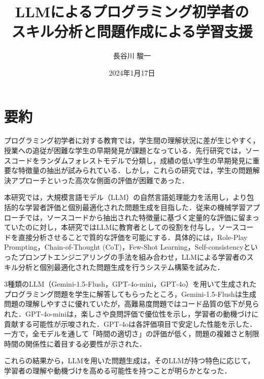 \documentclass[11pt]{jreport}
\begin{document}
\title{LLMによるプログラミング初学者の\\スキル分析と問題作成による学習支援}
\author{長谷川 駿一}
\date{2024年1月17日}

\maketitle

\chapter*{要約}
プログラミング初学者に対する教育では，学生間の理解状況に差が生じやすく，授業への追従が困難な学生の早期発見が課題となっている．先行研究では，ソースコードをランダムフォレストモデルで分類し，成績の低い学生の早期発見に重要な特徴量の抽出が試みられている．しかし，これらの研究では，学生の問題解決アプローチといった高次な側面の評価が困難であった．

本研究では，大規模言語モデル（LLM）の自然言語処理能力を活用し，より包括的な学習者評価と個別最適化された問題生成を目指した．従来の機械学習アプローチでは，ソースコードから抽出された特徴量に基づく定量的な評価に留まっていたのに対し，本研究ではLLMに教育者としての役割を付与し，ソースコードを直接分析させることで質的な評価を可能にする．具体的には，Role-Play Prompting，Chain-of-Thought (CoT)，Few-Shot Learning，Self-consistencyといったプロンプトエンジニアリングの手法を組み合わせ，LLMによる学習者のスキル分析と個別最適化された問題生成を行うシステム構築を試みた．

3種類のLLM（Gemini-1.5-Flush，GPT-4o-mini，GPT-4o）を用いて生成されたプログラミング問題を学生に解答してもらったところ，Gemini-1.5-Flushは生成問題の理解しやすさに優れていたが，高難易度問題ではコード品質の低下が見られた．GPT-4o-miniは，楽しさや良問評価で優位性を示し，学習者の動機づけに貢献する可能性が示唆された．GPT-4oは各評価項目で安定した性能を示した．一方で，全モデルを通して「時間の適切さ」の評価が低く，問題の複雑さと制限時間の関係性に着目する必要性が示された．

これらの結果から，LLMを用いた問題生成は，そのLLMが持つ特色に応じて，学習者の理解や動機づけを高める可能性を持つことが明らかとなった．

\newpage
\setcounter{page}{0}
\tableofcontents

\newpage
\setcounter{page}{1}

\end{document}
